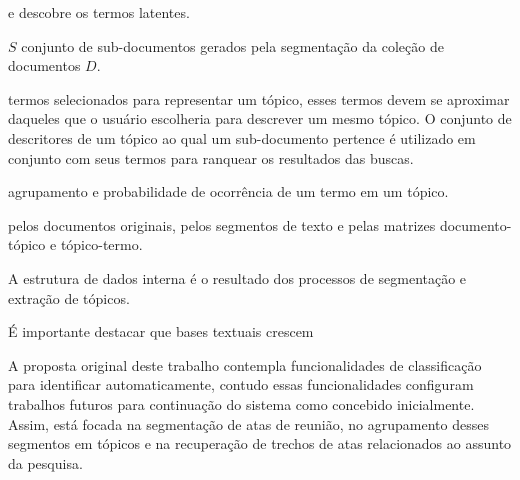 e descobre os termos latentes. 




$S$ conjunto de sub-documentos gerados pela segmentação da coleção de documentos $D$.







termos selecionados para representar um tópico, esses termos devem se aproximar daqueles que o usuário escolheria para descrever um mesmo tópico. O conjunto de descritores de um tópico ao qual um sub-documento pertence é utilizado em conjunto com seus termos para ranquear os resultados das buscas.


agrupamento e probabilidade de ocorrência de um termo em um tópico.

pelos documentos originais, pelos segmentos de texto e pelas matrizes documento-tópico e tópico-termo.








A estrutura de dados interna é o resultado dos processos de segmentação e extração de tópicos.









É importante destacar que bases textuais crescem 



A proposta original deste trabalho contempla funcionalidades de classificação para identificar automaticamente, contudo essas funcionalidades configuram trabalhos futuros para continuação do sistema como concebido inicialmente. Assim, está focada na segmentação de atas de reunião, no agrupamento desses segmentos em tópicos e na recuperação de trechos de atas relacionados ao assunto da pesquisa.



